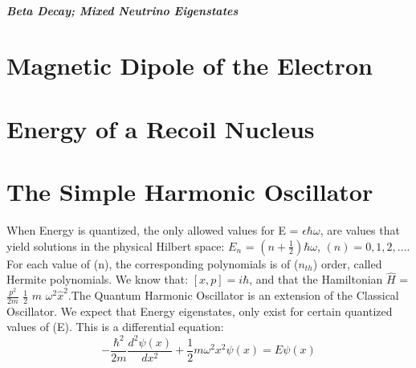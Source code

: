 \documentclass[a4paper, 10pt, onepage]{elegantbook}
\begin{document}
{\paragraph{Beta Decay; Mixed Neutrino Eigenstates}






\chapter{Magnetic Dipole of the Electron}

\chapter{Energy of a Recoil Nucleus}























\chapter{The Simple Harmonic Oscillator}


When Energy is quantized, the only allowed values for E = $\epsilon \hbar \omega$, are values that yield solutions in the physical Hilbert space: $E_n$ = $(n + \frac{1}{2}) \hbar \omega$, $(n) = 0, 1, 2,...$.  \\
For each value of (n), the corresponding polynomials is of ($n_{th}$) order, called Hermite polynomials. We know that: $\boxed{[x, p] = i \hbar}$, and that the Hamiltonian $\hat H$ = $\frac{p^2}{2m}$ $\frac{1}{2}$ $m$ $\omega^2 \hat x^2$.The Quantum Harmonic Oscillator is an extension of the Classical Oscillator. We expect that Energy eigenstates, only exist for certain quantized values of (E). This is a differential equation:
\begin{equation}
- \frac{\hbar^2}{2m}\frac{d^2 \psi (x)}{d x^2} + \frac{1}{2} m \omega^2 x^2 \psi (x) = E \psi (x)
\end{equation}

}
\end{document}
